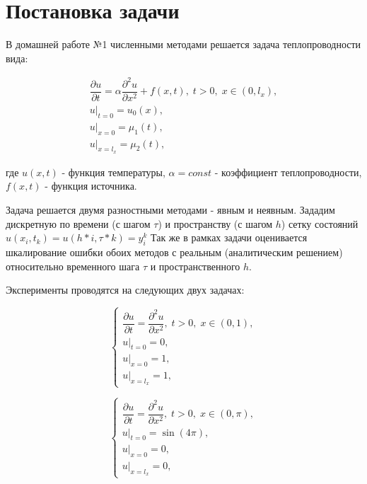 \section{Постановка задачи}

В домашней работе №1 численными методами решается задача теплопроводности вида:

\begin{equation}
\begin{array}{l}
\dfrac{\partial u}{\partial t} = \alpha \dfrac{\partial^2 u}{\partial x^2} + f(x, t), \; t > 0, \; x \in (0, l_x), \\
\left. u \right|_{t=0} = u_0(x), \\
\left. u \right|_{x=0} = \mu_1(t), \\
\left. u \right|_{x=l_x} = \mu_2(t),
\end{array}
\end{equation}

где $u(x, t)$ - функция температуры, $\alpha = const$ - коэффициент теплопроводности, $f(x, t)$ - функция источника. 

Задача решается двумя разностными методами - явным и неявным. 
Зададим дискретную по времени (с шагом $\tau$) и пространству (с шагом $h$) сетку состояний $u(x_i,t_k) = u(h*i, \tau*k) = y^k_i$
Так же в рамках задачи оценивается шкалирование ошибки обоих методов с реальным (аналитическим решением) относительно временного шага $\tau$ и пространственного $h$.

Эксперименты проводятся на следующих двух задачах:

\begin{equation}
\begin{cases}
\dfrac{\partial u}{\partial t} = \dfrac{\partial^2 u}{\partial x^2}, \; t > 0, \; x \in (0, 1), \\
\left. u \right|_{t=0} = 0, \\
\left. u \right|_{x=0} = 1, \\
\left. u \right|_{x=l_x} = 1,
\end{cases}
\label{eq:task1}
\end{equation}


\begin{equation}
\begin{cases}
\dfrac{\partial u}{\partial t} = \dfrac{\partial^2 u}{\partial x^2}, \; t > 0, \; x \in (0, \pi), \\
\left. u \right|_{t=0} = \sin{(4\pi)}, \\
\left. u \right|_{x=0} = 0, \\
\left. u \right|_{x=l_x} = 0,
\end{cases}
\label{eq:task2}
\end{equation}

